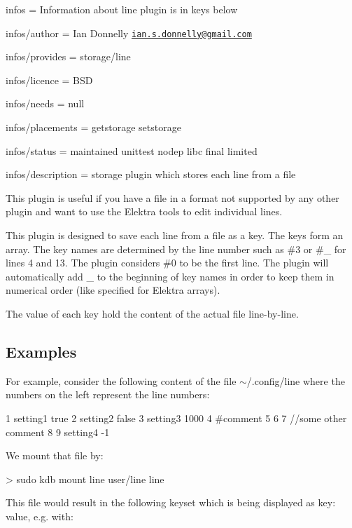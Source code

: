 
\begin{DoxyItemize}
\item infos = Information about line plugin is in keys below
\item infos/author = Ian Donnelly \href{mailto:ian.s.donnelly@gmail.com}{\tt ian.\+s.\+donnelly@gmail.\+com}
\item infos/provides = storage/line
\item infos/licence = B\+SD
\item infos/needs = null
\item infos/placements = getstorage setstorage
\item infos/status = maintained unittest nodep libc final limited
\item infos/description = storage plugin which stores each line from a file
\end{DoxyItemize}

This plugin is useful if you have a file in a format not supported by any other plugin and want to use the Elektra tools to edit individual lines.

This plugin is designed to save each line from a file as a key. The keys form an array. The key names are determined by the line number such as {\ttfamily \#3} or {\ttfamily \#\+\_} for lines 4 and 13. The plugin considers {\ttfamily \#0} to be the first line. The plugin will automatically add {\ttfamily \+\_\+} to the beginning of key names in order to keep them in numerical order (like specified for Elektra arrays).

The value of each key hold the content of the actual file line-\/by-\/line.

\subsection*{Examples}

For example, consider the following content of the file {\ttfamily $\sim$/.config/line} where the numbers on the left represent the line numbers\+: \begin{DoxyVerb}1  setting1 true
2  setting2 false
3  setting3 1000
4  #comment
5
6
7  //some other comment
8
9  setting4 -1
\end{DoxyVerb}


We mount that file by\+: \begin{DoxyVerb}> sudo kdb mount line user/line line
\end{DoxyVerb}


This file would result in the following keyset which is being displayed as {\ttfamily key\+: value}, e.\+g. with\+: 


